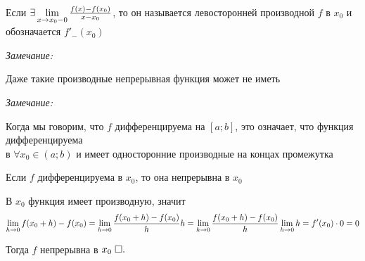 \documentclass{article}
\begin{document}
Если $\exists\slim{x\to x_0-0}\frac{f(x)-f(x_0)}{x-x_0}$, то он называется левосторонней производной $f$ в $x_0$ и обозначается $f'_{-}(x_0)$

{\it Замечание:}

Даже такие производные непрерывная функция может не иметь

\pagebreak

{\it Замечание:}

Когда мы говорим, что $f$ дифференцируема на $[a;b]$, это означает, что функция дифференцируема\\
в $\forall x_0 \in (a;b)$ и имеет односторонние производные на концах промежутка


\theorem

Если $f$ дифференцируема в $x_0$, то она непрерывна в $x_0$

\proof

В $x_0$ функция имеет производную, значит
\begin{align*}
	\slim{h\to 0}f(x_0+h)-f(x_0)=\slim{h\to 0}\frac{f(x_0+h)-f(x_0)}{h}h=\slim{h\to 0}\frac{f(x_0+h)-f(x_0)}{h}\slim{h\to 0}h=f'(x_0)\cdot 0=0
\end{align*}

Тогда $f$  непрерывна в $x_0\qed$
\end{document}
